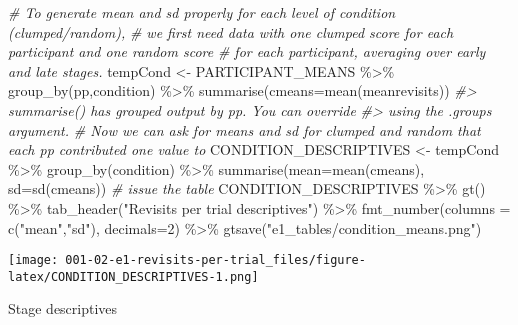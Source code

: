 \documentclass[
]{book}
\newenvironment{Shaded}{\begin{snugshade}}{\end{snugshade}}
\newcommand{\AttributeTok}[1]{\textcolor[rgb]{0.77,0.63,0.00}{#1}}
\newcommand{\CommentTok}[1]{\textcolor[rgb]{0.56,0.35,0.01}{\textit{#1}}}
\newcommand{\DecValTok}[1]{\textcolor[rgb]{0.00,0.00,0.81}{#1}}
\newcommand{\FunctionTok}[1]{\textcolor[rgb]{0.00,0.00,0.00}{#1}}
\newcommand{\NormalTok}[1]{#1}
\newcommand{\OtherTok}[1]{\textcolor[rgb]{0.56,0.35,0.01}{#1}}
\newcommand{\SpecialCharTok}[1]{\textcolor[rgb]{0.00,0.00,0.00}{#1}}
\newcommand{\StringTok}[1]{\textcolor[rgb]{0.31,0.60,0.02}{#1}}
\theoremstyle{definition}
\theoremstyle{definition}
\theoremstyle{definition}
\theoremstyle{definition}
\theoremstyle{remark}
\begin{document}
\begin{Shaded}
\begin{Highlighting}[]
\CommentTok{\# To generate mean and sd properly for each level of condition (clumped/random), }
\CommentTok{\# we first need data with one clumped score for each participant and one random score }
\CommentTok{\# for each participant, averaging over early and late stages.}
\NormalTok{tempCond }\OtherTok{\textless{}{-}}\NormalTok{ PARTICIPANT\_MEANS }\SpecialCharTok{\%\textgreater{}\%} \FunctionTok{group\_by}\NormalTok{(pp,condition) }\SpecialCharTok{\%\textgreater{}\%} \FunctionTok{summarise}\NormalTok{(}\AttributeTok{cmeans=}\FunctionTok{mean}\NormalTok{(meanrevisits))}
\CommentTok{\#\textgreater{} \textasciigrave{}summarise()\textasciigrave{} has grouped output by \textquotesingle{}pp\textquotesingle{}. You can override}
\CommentTok{\#\textgreater{} using the \textasciigrave{}.groups\textasciigrave{} argument.}
\CommentTok{\# Now we can ask for means and sd for clumped and random that each pp contributed one value to}
\NormalTok{CONDITION\_DESCRIPTIVES }\OtherTok{\textless{}{-}}\NormalTok{ tempCond }\SpecialCharTok{\%\textgreater{}\%} \FunctionTok{group\_by}\NormalTok{(condition) }\SpecialCharTok{\%\textgreater{}\%} \FunctionTok{summarise}\NormalTok{(}\AttributeTok{mean=}\FunctionTok{mean}\NormalTok{(cmeans), }\AttributeTok{sd=}\FunctionTok{sd}\NormalTok{(cmeans))}
\CommentTok{\# issue the table}
\NormalTok{CONDITION\_DESCRIPTIVES }\SpecialCharTok{\%\textgreater{}\%} 
  \FunctionTok{gt}\NormalTok{() }\SpecialCharTok{\%\textgreater{}\%} 
  \FunctionTok{tab\_header}\NormalTok{(}\StringTok{"Revisits per trial descriptives"}\NormalTok{) }\SpecialCharTok{\%\textgreater{}\%} 
  \FunctionTok{fmt\_number}\NormalTok{(}\AttributeTok{columns =} \FunctionTok{c}\NormalTok{(}\StringTok{"mean"}\NormalTok{,}\StringTok{"sd"}\NormalTok{), }\AttributeTok{decimals=}\DecValTok{2}\NormalTok{) }\SpecialCharTok{\%\textgreater{}\%} 
  \FunctionTok{gtsave}\NormalTok{(}\StringTok{"e1\_tables/condition\_means.png"}\NormalTok{)}
\end{Highlighting}
\end{Shaded}

\texttt{[image: 001-02-e1-revisits-per-trial\_files/figure-latex/CONDITION\_DESCRIPTIVES-1.png]}

Stage descriptives
\end{document}
